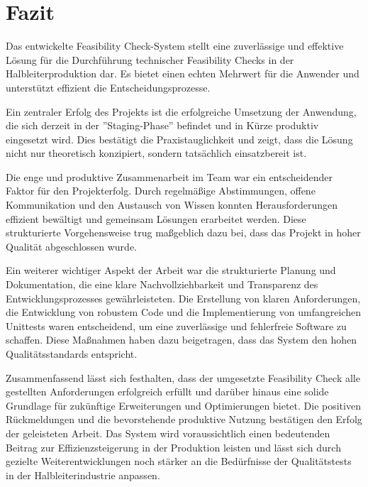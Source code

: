 \chapter{Fazit}

Das entwickelte Feasibility Check-System stellt eine zuverlässige und effektive Lösung für die Durchführung technischer Feasibility Checks in der Halbleiterproduktion dar. Es bietet einen echten Mehrwert für die Anwender und unterstützt effizient die Entscheidungsprozesse.

Ein zentraler Erfolg des Projekts ist die erfolgreiche Umsetzung der Anwendung, die sich derzeit in der ''Staging-Phase'' befindet und in Kürze produktiv eingesetzt wird. Dies bestätigt die Praxistauglichkeit und zeigt, dass die Lösung nicht nur theoretisch konzipiert, sondern tatsächlich einsatzbereit ist.

Die enge und produktive Zusammenarbeit im Team war ein entscheidender Faktor für den Projekterfolg. Durch regelmäßige Abstimmungen, offene Kommunikation und den Austausch von Wissen konnten Herausforderungen effizient bewältigt und gemeinsam Lösungen erarbeitet werden. Diese strukturierte Vorgehensweise trug maßgeblich dazu bei, dass das Projekt in hoher Qualität abgeschlossen wurde.

Ein weiterer wichtiger Aspekt der Arbeit war die strukturierte Planung und Dokumentation, die eine klare Nachvollziehbarkeit und Transparenz des Entwicklungsprozesses gewährleisteten. Die Erstellung von klaren Anforderungen, die Entwicklung von robustem Code und die Implementierung von umfangreichen Unittests waren entscheidend, um eine zuverlässige und fehlerfreie Software zu schaffen. Diese Maßnahmen haben dazu beigetragen, dass das System den hohen Qualitätsstandards entspricht.

Zusammenfassend lässt sich festhalten, dass der umgesetzte Feasibility Check alle gestellten Anforderungen erfolgreich erfüllt und darüber hinaus eine solide Grundlage für zukünftige Erweiterungen und Optimierungen bietet. Die positiven Rückmeldungen und die bevorstehende produktive Nutzung bestätigen den Erfolg der geleisteten Arbeit. Das System wird voraussichtlich einen bedeutenden Beitrag zur Effizienzsteigerung in der Produktion leisten und lässt sich durch gezielte Weiterentwicklungen noch stärker an die Bedürfnisse der Qualitätstests in der Halbleiterindustrie anpassen.




